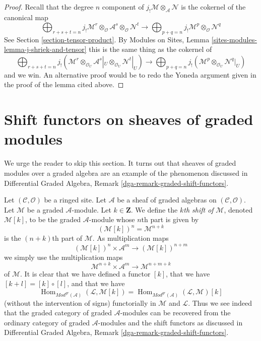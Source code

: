 \documentclass{stacks-project}
\theoremstyle{plain}
\theoremstyle{definition}
\theoremstyle{remark}
\numberwithin{equation}{subsection}
\def\Hom{\mathop{\mathrm{Hom}}\nolimits}
\begin{document}
\begin{proof}
Recall that the degree $n$ component of
$j_!\mathcal{M} \otimes_\mathcal{A} \mathcal{N}$ is the cokernel of
the canonical map
$$
\bigoplus\nolimits_{r + s + t = n}
j_!\mathcal{M}^r \otimes_\mathcal{O}
\mathcal{A}^s \otimes_\mathcal{O}
\mathcal{N}^t
\longrightarrow
\bigoplus\nolimits_{p + q = n}
j_!\mathcal{M}^p \otimes_\mathcal{O} \mathcal{N}^q
$$
See Section \ref{section-tensor-product}.
By Modules on Sites, Lemma \ref{sites-modules-lemma-j-shriek-and-tensor}
this is the same thing as the cokernel of
$$
\bigoplus\nolimits_{r + s + t = n}
j_!(\mathcal{M}^r \otimes_{\mathcal{O}_U}
\mathcal{A}^s|_U \otimes_{\mathcal{O}_U}
\mathcal{N}^t|_U)
\longrightarrow
\bigoplus\nolimits_{p + q = n}
j_!(\mathcal{M}^p \otimes_{\mathcal{O}_U} \mathcal{N}^q|_U)
$$
and we win. An alternative proof would be to redo the Yoneda
argument given in the proof of the lemma cited above.
\end{proof}








\section{Shift functors on sheaves of graded modules}
\label{section-shift}

\noindent
We urge the reader to skip this section. It turns out that sheaves
of graded modules over a graded algebra are an example of the phenomenon
discussed in
Differential Graded Algebra, Remark \ref{dga-remark-graded-shift-functors}.

\medskip\noindent
Let $(\mathcal{C}, \mathcal{O})$ be a ringed site.
Let $\mathcal{A}$ be a sheaf of graded algebras
on $(\mathcal{C}, \mathcal{O})$.
Let $\mathcal{M}$ be a graded $\mathcal{A}$-module. Let $k \in \mathbf{Z}$.
We define the {\it $k$th shift of} $\mathcal{M}$, denoted $\mathcal{M}[k]$,
to be the graded $\mathcal{A}$-module whose $n$th part is given by
$$
(\mathcal{M}[k])^n = \mathcal{M}^{n + k}
$$
is the $(n + k)$th part of $\mathcal{M}$. As multiplication maps
$$
(\mathcal{M}[k])^n \times \mathcal{A}^m
\longrightarrow
(\mathcal{M}[k])^{n + m}
$$
we simply use the multiplication maps
$$
\mathcal{M}^{n + k} \times \mathcal{A}^m
\longrightarrow
\mathcal{M}^{n + m + k}
$$
of $\mathcal{M}$. It is clear that we have defined a functor $[k]$,
that we have $[k + l] = [k] \circ [l]$, and that we have
$$
\Hom_{\textit{Mod}^{gr}(\mathcal{A})}(\mathcal{L}, \mathcal{M}[k]) =
\Hom_{\textit{Mod}^{gr}(\mathcal{A})}(\mathcal{L}, \mathcal{M})[k]
$$
(without the intervention of signs)
functorially in $\mathcal{M}$ and $\mathcal{L}$.
Thus we see indeed that the graded category of graded $\mathcal{A}$-modules
can be recovered from the ordinary category of graded $\mathcal{A}$-modules
and the shift functors as discussed in 
Differential Graded Algebra, Remark \ref{dga-remark-graded-shift-functors}.
\end{document}
